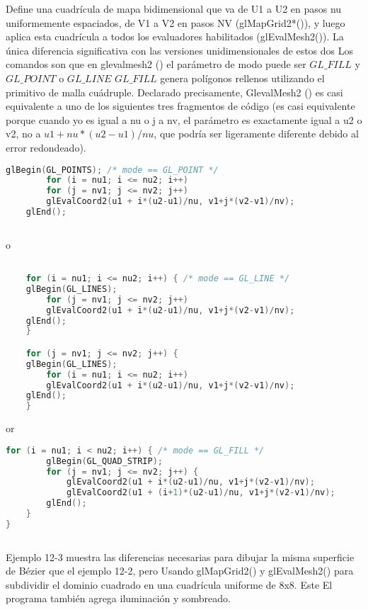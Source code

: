 Define una cuadrícula de mapa bidimensional que va de U1 a U2 en pasos nu uniformemente espaciados, de V1 a
V2 en pasos NV (glMapGrid2*()), y luego aplica esta cuadrícula a todos los evaluadores habilitados
(glEvalMesh2()). La única diferencia significativa con las versiones unidimensionales de estos dos
Los comandos son que en glevalmesh2 () el parámetro de modo puede ser $GL\_FILL$ y $GL\_POINT$
o $GL\_LINE$ $GL\_FILL$ genera polígonos rellenos utilizando el primitivo de malla cuádruple. Declarado precisamente,
GlevalMesh2 () es casi equivalente a uno de los siguientes tres fragmentos de código (es casi
equivalente porque cuando yo es igual a nu o j a nv, el parámetro es exactamente igual a u2 o v2, no
a $u1+nu*(u2-u1)/nu$, que podría ser ligeramente diferente debido al error redondeado).


\begin{lstlisting}[language=C++]
    glBegin(GL_POINTS); /* mode == GL_POINT */
        for (i = nu1; i <= nu2; i++)
        for (j = nv1; j <= nv2; j++)
        glEvalCoord2(u1 + i*(u2-u1)/nu, v1+j*(v2-v1)/nv);
    glEnd();
    
\end{lstlisting}

o

\begin{lstlisting}[language=C++]

    for (i = nu1; i <= nu2; i++) { /* mode == GL_LINE */
    glBegin(GL_LINES);
        for (j = nv1; j <= nv2; j++)
        glEvalCoord2(u1 + i*(u2-u1)/nu, v1+j*(v2-v1)/nv);
    glEnd();
    }

    for (j = nv1; j <= nv2; j++) {
    glBegin(GL_LINES);
        for (i = nu1; i <= nu2; i++)
        glEvalCoord2(u1 + i*(u2-u1)/nu, v1+j*(v2-v1)/nv);
    glEnd();
    }

\end{lstlisting}

or

\begin{lstlisting}[language=C++]
    for (i = nu1; i < nu2; i++) { /* mode == GL_FILL */
        glBegin(GL_QUAD_STRIP);
        for (j = nv1; j <= nv2; j++) {
            glEvalCoord2(u1 + i*(u2-u1)/nu, v1+j*(v2-v1)/nv);
            glEvalCoord2(u1 + (i+1)*(u2-u1)/nu, v1+j*(v2-v1)/nv);
        glEnd();
    }
}
    
\end{lstlisting}

Ejemplo 12-3 muestra las diferencias necesarias para dibujar la misma superficie de Bézier que el ejemplo 12-2, pero
Usando glMapGrid2() y glEvalMesh2() para subdividir el dominio cuadrado en una cuadrícula uniforme de 8x8. Este
El programa también agrega iluminación y sombreado.

